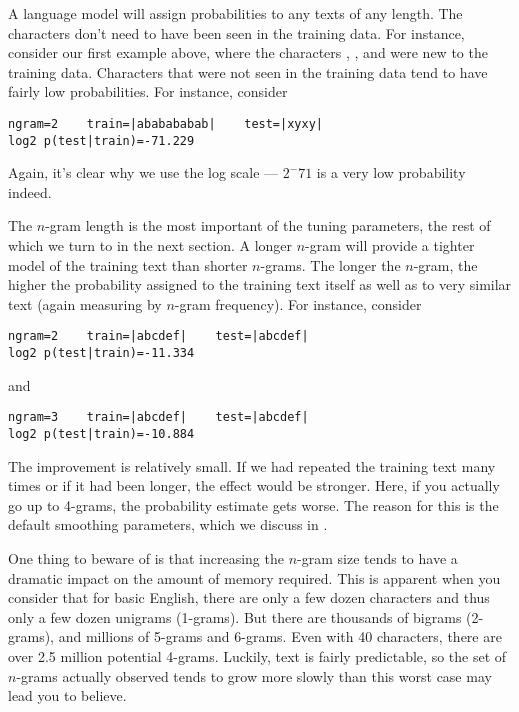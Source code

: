 A language model will assign probabilities to any texts of any length.
The characters don't need to have been seen in the training data.  For
instance, consider our first example above, where the characters
, , and  were new to the
training data.  Characters that were not seen in the training data tend
to have fairly low probabilities.  For instance, consider
%
\begin{verbatim}
ngram=2    train=|ababababab|    test=|xyxy|
log2 p(test|train)=-71.229
\end{verbatim}
%
Again, it's clear why we use the log scale --- $2^-{71}$ is a very low
probability indeed.

The $n$-gram length is the most important of the tuning parameters,
the rest of which we turn to in the next section.  A longer $n$-gram
will provide a tighter model of the training text than shorter
$n$-grams.  The longer the $n$-gram, the higher the probability
assigned to the training text itself as well as to very similar text
(again measuring by $n$-gram frequency).  For instance, consider

\begin{verbatim}
ngram=2    train=|abcdef|    test=|abcdef|
log2 p(test|train)=-11.334
\end{verbatim}

and

\begin{verbatim}
ngram=3    train=|abcdef|    test=|abcdef|
log2 p(test|train)=-10.884
\end{verbatim}

The improvement is relatively small.  If we had repeated the training
text many times or if it had been longer, the effect would be
stronger.  Here, if you actually go up to 4-grams, the probability
estimate gets worse.  The reason for this is the default smoothing
parameters, which we discuss in .

One thing to beware of is that increasing the $n$-gram size tends to
have a dramatic impact on the amount of memory required.  This is
apparent when you consider that for basic English, there are only a
few dozen characters and thus only a few dozen unigrams (1-grams).
But there are thousands of bigrams (2-grams), and millions of
5-grams and 6-grams.  Even with 40 characters, there are over
2.5 million potential 4-grams.  Luckily, text is fairly predictable,
so the set of $n$-grams actually observed tends to grow more
slowly than this worst case may lead you to believe.  


